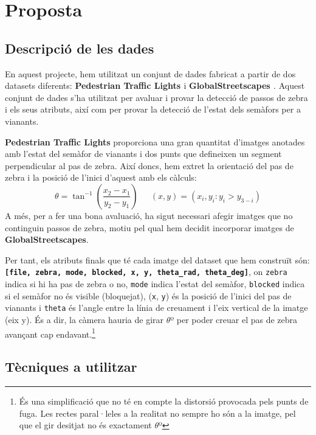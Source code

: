 \documentclass[10pt,a4paper,twocolumn,twoside]{article}
\begin{document}
\section{Proposta}

\subsection{Descripció de les dades}
En aquest projecte, hem utilitzat un conjunt de dades fabricat a partir de dos datasets diferents: \textbf{Pedestrian Traffic Lights \cite{ImVisible}} i \textbf{GlobalStreetscapes \cite{GlobalStreetscapes}}.
Aquest conjunt de dades s’ha utilitzat per avaluar i provar la detecció de passos de zebra i els seus atributs, així com per provar la detecció de l’estat dels semàfors per a vianants.

\textbf{Pedestrian Traffic Lights} proporciona una gran quantitat d'imatges anotades amb l'estat del semàfor de vianants i dos punts que defineixen un segment perpendicular al pas de zebra.
Així doncs, hem extret la orientació del pas de zebra i la posició de l'inici d'aquest amb els càlculs:
\begin{equation*}
	\theta = \tan^{-1}\left( \frac{x_2 - x_1}{y_2 - y_1} \right) \ \ \quad
	(x, y) = (x_i, y_i : y_i > y_{3-i})
\end{equation*}
A més, per a fer una bona avaluació, ha sigut necessari afegir imatges que no continguin passos de zebra, motiu pel qual hem decidit incorporar imatges de \textbf{GlobalStreetscapes}.

Per tant, els atributs finals que té cada imatge del dataset que hem construït són: \textbf{\texttt{[file, zebra, mode, blocked, x, y, theta\_rad, theta\_deg]}}, on \texttt{zebra} indica si hi ha pas de zebra o no, \texttt{mode} indica l'estat del semàfor, \texttt{blocked} indica si el semàfor no és visible (bloquejat), (\texttt{x}, \texttt{y}) és la posició de l'inici del pas de vianants i \texttt{theta} és l'angle entre la línia de creuament i l’eix vertical de la imatge (eix y). És a dir, la càmera hauria de girar $\theta$º per poder creuar el pas de zebra avançant cap endavant.\footnote{És una simplificació que no té en compte la distorsió provocada pels punts de fuga. Les rectes paral·leles a la realitat no sempre ho són a la imatge, pel que el gir desitjat no és exactament $\theta$º}

\subsection{Tècniques a utilitzar}
 
\end{document}
